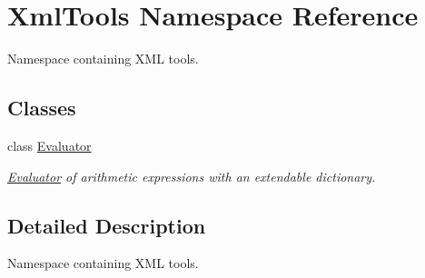\hypertarget{namespace_xml_tools}{}\section{Xml\+Tools Namespace Reference}
\label{namespace_xml_tools}


Namespace containing X\+ML tools.  


\subsection*{Classes}
\begin{DoxyCompactItemize}
\item 
class \hyperlink{class_xml_tools_1_1_evaluator}{Evaluator}
\begin{DoxyCompactList}\small\item\em \hyperlink{class_xml_tools_1_1_evaluator}{Evaluator} of arithmetic expressions with an extendable dictionary. \end{DoxyCompactList}\end{DoxyCompactItemize}


\subsection{Detailed Description}
Namespace containing X\+ML tools. 